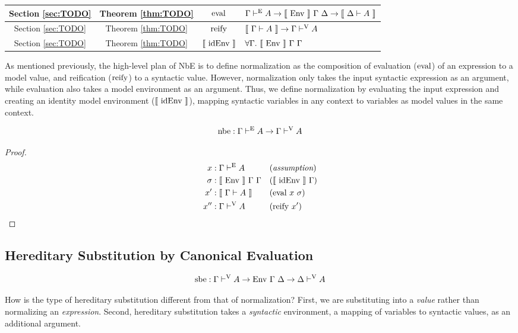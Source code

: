 \documentclass{llncs}
\newcommand{\refthm}[1]{Theorem \ref{thm:#1}}
\newcommand{\refsec}[1]{Section \ref{sec:#1}}
\def\marr{\rightarrow}
\def\reify{\fun{reify}}
\def\eval{\fun{eval}}
\def\sbe{\fun{sbe}}
\def\midenv{\el{\fun{idEnv}}}
\def\byass{(\textit{assumption})}
\newcommand{\by}[1]{(#1)}
\newcommand{\turn}[1]{\vdash^\con{#1}}
\newcommand{\all}[1]{\forall#1.~}
\newcommand{\el}[1]{\llbracket ~ #1 ~ \rrbracket}
\newcommand{\con}[1]{\textmd{#1}}
\newcommand{\fun}[1]{\textmd{#1}}
\newcommand{\typm}[1]{\el{\Gamma \vdash #1}}
\newcommand{\dtypm}[1]{\el{\Delta \vdash #1}}
\newcommand{\type}[1]{\Gamma \turn{E} #1}
\newcommand{\typv}[1]{\Gamma \turn{V} #1}
\newcommand{\dtypv}[1]{\Delta \turn{V} #1}
\def\menv{\el{\fun{Env}}~\Gamma~\Delta}
\def\env{\fun{Env}~\Gamma~\Delta}
\newcommand{\gmenv}[1]{\el{\fun{Env}}~\Gamma~#1}
\newcommand{\cmenv}[2]{\el{\fun{Env}}~#1~#2}
\begin{document}
\hfill \break
\begin{tabularx}{\textwidth}{ |c|c|c|X| }
  \hline
  \refsec{TODO} & \refthm{TODO} & $\eval$ & $\type{A} \marr \menv \marr \dtypm{A}$ \\
  \hline
  \refsec{TODO} & \refthm{TODO} & $\reify$ & $\typm{A} \marr \typv{A}$ \\
  \hline
  \refsec{TODO} & \refthm{TODO} & $\midenv$ & $\all{\Gamma} \gmenv{\Gamma}$ \\
  \hline
\end{tabularx}
\hfill \break

As mentioned previously, the high-level plan of NbE is to define
normalization as the composition of evaluation ($\eval$) of an expression to a
model value, and reification ($\reify$) to a syntactic value. However,
normalization only takes the input syntactic expression as an
argument, while evaluation also takes a model environment as an
argument. Thus, we define normalization by evaluating the input
expression and creating an identity model environment ($\midenv$),
mapping syntactic variables in any context to variables as model
values in the same context.

\begin{theorem}
\label{thm:mod:nbe}
$$
\fun{nbe} : \type{A} \marr \typv{A}
$$

\begin{proof}
\begin{align*}
x    &: \type{A} && \byass\\
\sigma &: \cmenv{\Gamma}{\Gamma} && \by{\midenv~\Gamma}\\
x'  &: \typm{A} && \by{\eval~x~\sigma}\\
x'' &: \typv{A} && \by{\reify~x'}
\end{align*}
\end{proof}

\end{theorem}

\subsection{Hereditary Substitution by Canonical Evaluation}

$$
\sbe : \typv{A} \marr \env \marr \dtypv{A}
$$

How is the type of hereditary substitution different from that of
normalization? First, we are substituting into a \textit{value} rather
than normalizing an \textit{expression}. Second, hereditary
substitution takes a \textit{syntactic} environment, a mapping of
variables to syntactic values, as an additional argument.
\end{document}
